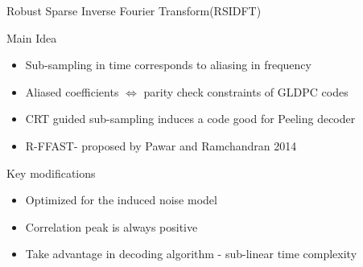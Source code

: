 \begin{frame}{Robust Sparse Inverse Fourier Transform(RSIDFT)}
\begin{block}{Main Idea}
	\begin{itemize}
		\item \alert{Sub-sampling} in time corresponds to \alert{aliasing} in frequency
		\item Aliased coefficients $\Leftrightarrow$ parity check constraints of \alert{GLDPC codes}
		\item \alert{CRT} guided sub-sampling induces a code good for \alert{Peeling decoder}
		\item R-FFAST- proposed by Pawar and Ramchandran 2014
	\end{itemize}
\end{block}
\begin{block}{Key modifications}
   \begin{itemize}
   	\item Optimized for the induced noise model
   	\item Correlation peak is always {\color{blue} positive}
   	\item Take advantage in decoding algorithm - {\color{blue}sub-linear} time complexity
   \end{itemize}
\end{block}
\end{frame}




